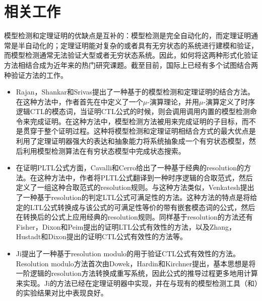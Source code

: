 \section{相关工作}
模型检测和定理证明的优缺点是互补的：模型检测是完全自动化的，而定理证明通常是半自动化的；定理证明能对复杂的或者具有无穷状态的系统进行建模和验证，而模型检测通常无法验证大型或者无穷状态系统。因此，如何将这两种形式化验证方法相结合成为近年来的热门研究课题。截至目前，国际上已经有多个试图结合两种验证方法的工作。
\begin{itemize}
	\item Rajan，Shankar和Srivas提出了一种基于的模型检测和定理证明的结合方法\cite{RajanSS95}。在这种方法中，作者首先在中定义了一个$\mu$-演算理论，并用$\mu$-演算定义了时序逻辑\textsf{CTL}的模态词，当证明\textsf{CTL}公式的时候，则会调用调用内置的模型检测命令来完成证明。在这种方法中，模型检测方法被用来完成证明的子目标，而不是贯穿于整个证明过程。这种将模型检测和定理证明相结合方式的最大优点是利用了定理证明器强大的表达和抽象能力将系统抽象成一个有穷状态模型，然后利用模型检测算法在有穷状态模型中完成状态搜索。
	\item 在证明\textsf{PLTL}公式方面，Cavalli和Cerro给出了一种基于经典的resolution的方法\cite{CavalliC84}。在这种方法中，作者将\textsf{PLTL}公式翻译到一种时序逻辑的合取范式，然后定义了一组这种合取范式的resolution规则。与这种方法类似，Venkatesh提出了一种基于resolution的判定\textsf{LTL}公式可满足性的方法\cite{Venkatesh85}。这种方法的特点是将给定的\textsf{LTL}公式转换成与该公式的可满足性等价的带有嵌套模态词的公式，然后在转换后的公式上应用经典的resolution规则。同样基于resolution的方法还有Fisher，Dixon和Peim提出的证明\textsf{LTL}公式有效性的方法\cite{FisherDP01}，以及Zhang，Hustadt和Dixon提出的证明\textsf{CTL}公式有效性的方法\cite{ZhangHD14}等。
	\item Ji提出了一种基于resolution modulo的用于验证\textsf{CTL}公式有效性的方法\cite{Ji15}。Resolution modulo方法首次由Dowek，Hardin和Kirchner提出\cite{DowekHK03,Dowek10}，基本思想是将一阶逻辑的resolution方法转换成重写系统，因此公式的推导过程更多地用计算来实现。Ji的方法已经在定理证明器中实现，并在与现有的模型检测工具（\nusmv{}和\verds{}）的实验结果对比中表现良好。
\end{itemize}
